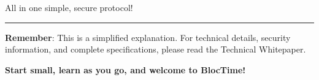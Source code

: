 \documentclass[11pt,a4paper]{article}
\begin{document}
All in one simple, secure protocol!

\vspace{1cm}
\hrule
\vspace{0.5cm}

\textbf{Remember}: This is a simplified explanation. For technical details, security information, and complete specifications, please read the Technical Whitepaper.

\textbf{Start small, learn as you go, and welcome to BlocTime!}
\end{document}
